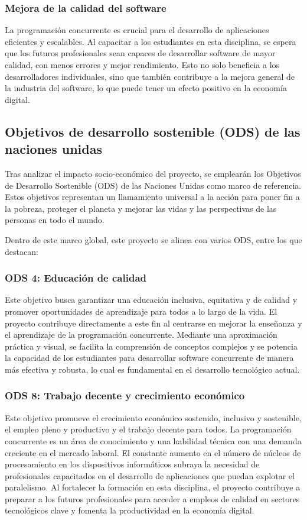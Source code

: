 \subsubsection{Mejora de la calidad del software}
La programación concurrente es crucial para el desarrollo de aplicaciones eficientes y escalables. Al capacitar a los estudiantes en esta disciplina, se espera que los futuros profesionales sean capaces de desarrollar software de mayor calidad, con menos errores y mejor rendimiento. Esto no solo beneficia a los desarrolladores individuales, sino que también contribuye a la mejora general de la industria del software, lo que puede tener un efecto positivo en la economía digital.

\subsection{Objetivos de desarrollo sostenible (ODS) de las naciones unidas}\label{subsec:ods}
Tras analizar el impacto socio-económico del proyecto, se emplearán los Objetivos de Desarrollo Sostenible (ODS) de las Naciones Unidas \cite{ods} como marco de referencia. Estos objetivos representan un llamamiento universal a la acción para poner fin a la pobreza, proteger el planeta y mejorar las vidas y las perspectivas de las personas en todo el mundo.

Dentro de este marco global, este proyecto se alinea con varios ODS, entre los que destacan:

\subsubsection{ODS 4: Educación de calidad \cite{ods_4}}
Este objetivo busca garantizar una educación inclusiva, equitativa y de calidad y promover oportunidades de aprendizaje para todos a lo largo de la vida. El proyecto contribuye directamente a este fin al centrarse en mejorar la enseñanza y el aprendizaje de la programación concurrente. Mediante una aproximación práctica y visual, se facilita la comprensión de conceptos complejos y se potencia la capacidad de los estudiantes para desarrollar software concurrente de manera más efectiva y robusta, lo cual es fundamental en el desarrollo tecnológico actual.

\subsubsection{ODS 8: Trabajo decente y crecimiento económico \cite{ods_8}}
Este objetivo promueve el crecimiento económico sostenido, inclusivo y sostenible, el empleo pleno y productivo y el trabajo decente para todos. La programación concurrente es un área de conocimiento y una habilidad técnica con una demanda creciente en el mercado laboral. El constante aumento en el número de núcleos de procesamiento en los dispositivos informáticos subraya la necesidad de profesionales capacitados en el desarrollo de aplicaciones que puedan explotar el paralelismo. Al fortalecer la formación en esta disciplina, el proyecto contribuye a preparar a los futuros profesionales para acceder a empleos de calidad en sectores tecnológicos clave y fomenta la productividad en la economía digital.

